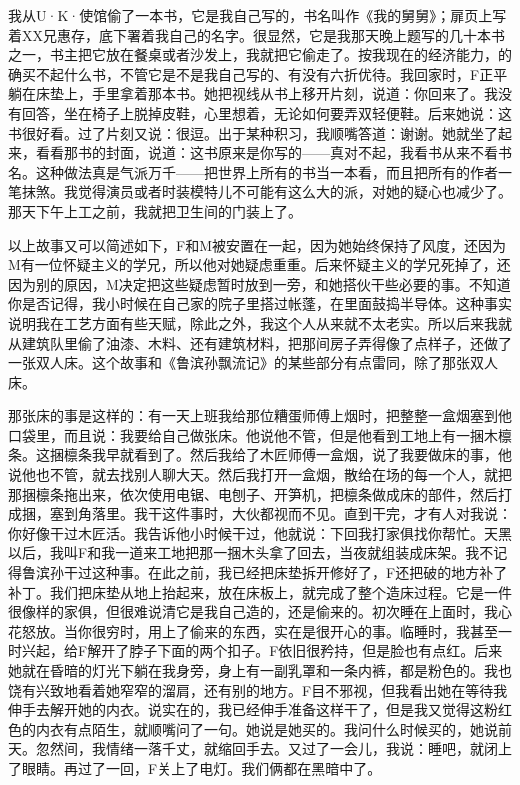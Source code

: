 我从U·K·使馆偷了一本书，它是我自己写的，书名叫作《我的舅舅》；扉页上写着XX兄惠存，底下署着我自己的名字。很显然，它是我那天晚上题写的几十本书之一，书主把它放在餐桌或者沙发上，我就把它偷走了。按我现在的经济能力，的确买不起什么书，不管它是不是我自己写的、有没有六折优待。我回家时，F正平躺在床垫上，手里拿着那本书。她把视线从书上移开片刻，说道：你回来了。我没有回答，坐在椅子上脱掉皮鞋，心里想着，无论如何要弄双轻便鞋。后来她说：这书很好看。过了片刻又说：很逗。出于某种积习，我顺嘴答道：谢谢。她就坐了起来，看看那书的封面，说道：这书原来是你写的——真对不起，我看书从来不看书名。这种做法真是气派万千——把世界上所有的书当一本看，而且把所有的作者一笔抹煞。我觉得演员或者时装模特儿不可能有这么大的派，对她的疑心也减少了。那天下午上工之前，我就把卫生间的门装上了。 

以上故事又可以简述如下，F和M被安置在一起，因为她始终保持了风度，还因为M有一位怀疑主义的学兄，所以他对她疑虑重重。后来怀疑主义的学兄死掉了，还因为别的原因，M决定把这些疑虑暂时放到一旁，和她搭伙干些必要的事。不知道你是否记得，我小时候在自己家的院子里搭过帐蓬，在里面鼓捣半导体。这种事实说明我在工艺方面有些天赋，除此之外，我这个人从来就不太老实。所以后来我就从建筑队里偷了油漆、木料、还有建筑材料，把那间房子弄得像了点样子，还做了一张双人床。这个故事和《鲁滨孙飘流记》的某些部分有点雷同，除了那张双人床。 

那张床的事是这样的：有一天上班我给那位糟蛋师傅上烟时，把整整一盒烟塞到他口袋里，而且说：我要给自己做张床。他说他不管，但是他看到工地上有一捆木檩条。这捆檩条我早就看到了。然后我给了木匠师傅一盒烟，说了我要做床的事，他说他也不管，就去找别人聊大天。然后我打开一盒烟，散给在场的每一个人，就把那捆檩条拖出来，依次使用电锯、电刨子、开笋机，把檩条做成床的部件，然后打成捆，塞到角落里。我干这件事时，大伙都视而不见。直到干完，才有人对我说：你好像干过木匠活。我告诉他小时候干过，他就说：下回我打家俱找你帮忙。天黑以后，我叫F和我一道来工地把那一捆木头拿了回去，当夜就组装成床架。我不记得鲁滨孙干过这种事。在此之前，我已经把床垫拆开修好了，F还把破的地方补了补丁。我们把床垫从地上抬起来，放在床板上，就完成了整个造床过程。它是一件很像样的家俱，但很难说清它是我自己造的，还是偷来的。初次睡在上面时，我心花怒放。当你很穷时，用上了偷来的东西，实在是很开心的事。临睡时，我甚至一时兴起，给F解开了脖子下面的两个扣子。F依旧很矜持，但是脸也有点红。后来她就在昏暗的灯光下躺在我身旁，身上有一副乳罩和一条内裤，都是粉色的。我也饶有兴致地看着她窄窄的溜肩，还有别的地方。F目不邪视，但我看出她在等待我伸手去解开她的内衣。说实在的，我已经伸手准备这样干了，但是我又觉得这粉红色的内衣有点陌生，就顺嘴问了一句。她说是她买的。我问什么时候买的，她说前天。忽然间，我情绪一落千丈，就缩回手去。又过了一会儿，我说：睡吧，就闭上了眼睛。再过了一回，F关上了电灯。我们俩都在黑暗中了。 


